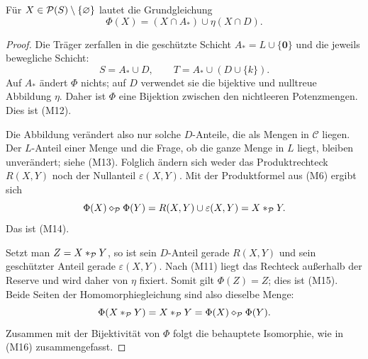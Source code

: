 \documentclass[main.tex]{subfiles}
\begin{document}

Für \(X\in\mathcal{P}(S)\setminus\{\varnothing\}\) lautet die Grundgleichung
\[
  \Phi(X)=(X\cap A_*)\cup\eta(X\cap D).
\]

\begin{proof}
Die Träger zerfallen in die geschützte Schicht
\(A_*=L\cup\{\mathbf0\}\) und die jeweils bewegliche Schicht:
\[
  S=A_*\cup D,
  \qquad
  T=A_*\cup(D\cup\{k\}).
\]
Auf \(A_*\) ändert \(\Phi\) nichts; auf \(D\) verwendet sie die bijektive
und nulltreue Abbildung \(\eta\). Daher ist \(\Phi\) eine Bijektion zwischen
den nichtleeren Potenzmengen. Dies ist \textup{(M12)}.

Die Abbildung verändert also nur solche \(D\)-Anteile, die als Mengen in
\(\mathcal C\) liegen. Der \(L\)-Anteil einer Menge und die Frage, ob die
ganze Menge in \(L\) liegt, bleiben unverändert; siehe \textup{(M13)}.
Folglich ändern sich weder das
Produktrechteck \(R(X,Y)\) noch der Nullanteil \(\varepsilon(X,Y)\). Mit der
Produktformel aus \textup{(M6)} ergibt sich
\[
  \Phi(X)\mathbin{\diamond}_{\mathcal P}\Phi(Y)
    =R(X,Y)\cup\varepsilon(X,Y)
    =X\mathbin{\ast}_{\mathcal P}Y.
\]
Das ist \textup{(M14)}.

Setzt man \(Z=X\mathbin{\ast}_{\mathcal P}Y\), so ist sein \(D\)-Anteil gerade
\(R(X,Y)\) und sein geschützter Anteil gerade \(\varepsilon(X,Y)\). Nach
\textup{(M11)} liegt das Rechteck außerhalb der Reserve und wird daher von
\(\eta\) fixiert. Somit gilt \(\Phi(Z)=Z\); dies ist \textup{(M15)}. Beide
Seiten der Homomorphiegleichung sind also dieselbe Menge:
\[
  \Phi(X\mathbin{\ast}_{\mathcal P}Y)
    =X\mathbin{\ast}_{\mathcal P}Y
    =\Phi(X)\mathbin{\diamond}_{\mathcal P}\Phi(Y).
\]
Zusammen mit der Bijektivität von \(\Phi\) folgt die behauptete Isomorphie,
wie in \textup{(M16)} zusammengefasst.
\end{proof}
\end{document}
